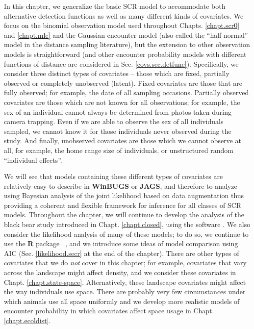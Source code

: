In this chapter, we generalize the basic SCR model to accommodate both
alternative detection functions as well as many different kinds of
covariates. We focus on the binomial observation model used throughout
Chapts. \ref{chapt.scr0} and \ref{chapt.mle} and the Gaussian
encounter model (also called the ``half-normal'' model in the distance
sampling literature), but the extension to other observation models is
straightforward (and other encounter probability models with different
functions of distance are considered in Sec. \ref{covs.sec.detfunc}).
Specifically, we consider three distinct types of covariates -- those
which are fixed, partially observed or completely unobserved (latent).
Fixed covariates are those that are fully observed; for example, the
date of all sampling occasions.  Partially observed covariates are
those which are not known for all observations; for example, the sex
of an individual cannot always be determined from photos taken during
camera trapping.  Even if we are able to observe the sex of all
individuals sampled, we cannot know it for those individuals never
observed during the study.  And finally, unobserved covariates are
those which we cannot observe at all, for example, the home range size
of individuals, or unstructured random ``individual effects''.


We will see that models containing these different types of covariates
are relatively easy to describe in {\bf WinBUGS} or {\bf JAGS}, and
therefore to analyze using Bayesian analysis of the joint likelihood
based on data augmentation thus providing a coherent and flexible
framework for inference for all classes of SCR models.  Throughout the
chapter, we will continue to develop the analysis of the black bear
study introduced in Chapt. \ref{chapt.closed}, using the software
\jags.  We also consider the likelihood analysis of many of these
models; to do so, we continue to use the {\bf R} package \secr~, and
we introduce some ideas of model comparison using AIC
(Sec. \ref{likelihood.secr} at the end of the chapter).  There are
other types of covariates that we do {\it not} cover in this chapter;
for example, covariates that vary across the landscape might affect
density, and we consider these covariates in
Chapt. \ref{chapt.state-space}.  Alternatively, these landscape
covariates might affect the way individuals use space. There are
probably very few circumstances under which animals use all space
uniformly and we develop more realistic models of encounter
probability in which covariates affect space usage in
Chapt. \ref{chapt.ecoldist}.


